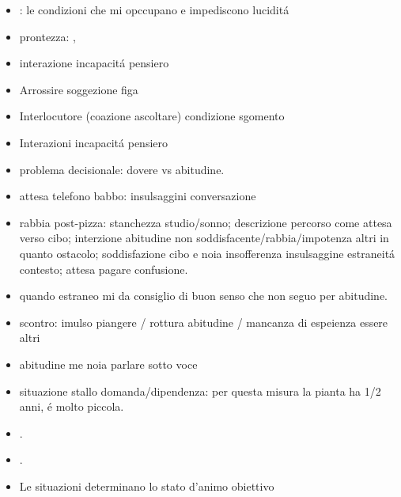 \begin{itemize}

\item {}: le condizioni che mi opccupano e impediscono lucidit\'a

\item prontezza: , 

\item interazione incapacit\'a pensiero

\item Arrossire soggezione figa

\item Interlocutore (coazione ascoltare) condizione sgomento

\item Interazioni incapacit\'a pensiero

\item problema decisionale: dovere vs abitudine. 

\item attesa telefono babbo: insulsaggini conversazione

\item rabbia post-pizza: stanchezza studio/sonno; descrizione percorso come attesa verso cibo; interzione abitudine non soddisfacente/rabbia/impotenza altri in quanto ostacolo; soddisfazione cibo e noia insofferenza insulsaggine estraneit\'a contesto; attesa pagare confusione.

\item quando estraneo mi da consiglio di buon senso che non seguo per abitudine.


\item scontro: imulso piangere / rottura abitudine / mancanza di espeienza essere altri

\item abitudine me noia parlare sotto voce

\item situazione stallo domanda/dipendenza: per questa misura la pianta ha 1/2 anni, \'e molto piccola.

\item {}.

\item {}.

\item Le situazioni determinano lo stato d'animo obiettivo


\end{itemize}
